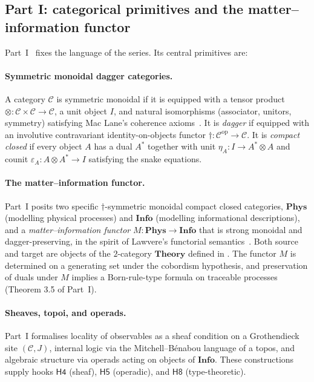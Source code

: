 \documentclass[12pt]{article}
\theoremstyle{definition}
\theoremstyle{remark}
\newcommand{\C}{\mathcal{C}}
\newcommand{\Phys}{\mathbf{Phys}}
\newcommand{\Info}{\mathbf{Info}}
\newcommand{\Theory}{\mathbf{Theory}}
\newcommand{\op}{\mathrm{op}}
\begin{document}
\subsection{Part I: categorical primitives and the matter--information
  functor}
\label{sec:recap-I}

Part~I~\cite{partI} fixes the language of the series. Its central primitives
are:

\paragraph{Symmetric monoidal dagger categories.} A category $\C$ is
symmetric monoidal if it is equipped with a tensor product
$\otimes : \C \times \C \to \C$, a unit object $I$, and natural isomorphisms
(associator, unitors, symmetry) satisfying Mac Lane's coherence axioms~\cite{maclane1998,joyalstreet1991}. It is
\emph{dagger} if equipped with an involutive contravariant identity-on-objects
functor $\dagger : \C^\op \to \C$. It is \emph{compact closed} if every object
$A$ has a dual $A^*$ together with unit $\eta_A : I \to A^* \otimes A$ and
counit $\varepsilon_A : A \otimes A^* \to I$ satisfying the snake equations.

\paragraph{The matter--information functor.} Part~I posits two specific
$\dagger$-symmetric monoidal compact closed categories, $\Phys$ (modelling
physical processes) and $\Info$ (modelling informational descriptions),
and a \emph{matter--information functor} $M : \Phys \to \Info$ that is
strong monoidal and dagger-preserving, in the spirit of Lawvere's
functorial semantics~\cite{lawvere1963}. Both source and target are objects of the
$2$-category $\Theory$ defined in . The functor $M$ is
determined on a generating set under the cobordism hypothesis, and
preservation of duals under $M$ implies a Born-rule-type formula on
traceable processes (Theorem 3.5 of Part~I).

\paragraph{Sheaves, topoi, and operads.} Part~I formalises locality of
observables as a sheaf condition on a Grothendieck site $(\C, J)$, internal
logic via the Mitchell--B\'enabou language of a topos, and algebraic structure
via operads acting on objects of $\Info$. These constructions supply hooks
$\mathsf{H4}$ (sheaf), $\mathsf{H5}$ (operadic), and $\mathsf{H8}$
(type-theoretic).
\end{document}

